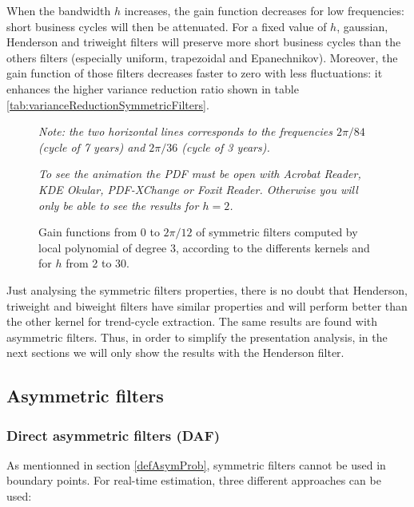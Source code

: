 \documentclass[
  12pt,
  ,
  a4paper]{article}
\newcommand\1{\mathds{1}}
\begin{document}
When the bandwidth \(h\) increases, the gain function decreases for low frequencies: short business cycles will then be attenuated.
For a fixed value of \(h\), gaussian, Henderson and triweight filters will preserve more short business cycles than the others filters (especially uniform, trapezoidal and Epanechnikov).
Moreover, the gain function of those filters decreases faster to zero with less fluctuations: it enhances the higher variance reduction ratio shown in table \ref{tab:varianceReductionSymmetricFilters}.

\begin{figure}[!ht]
\caption{Gain functions from 0 to $2\pi/12$ of symmetric filters computed by local polynomial of degree $3$, according to the differents kernels and for $h$ from 2 to 30.}\label{fig:filtersSymgains}\footnotesize
\emph{Note: the two horizontal lines corresponds to the frequencies $2\pi/84$ (cycle of 7 years) and $2\pi/36$ (cycle of 3 years).}

\emph{To see the animation the PDF must be open with Acrobat Reader, KDE Okular, PDF-XChange or Foxit Reader.
Otherwise you will only be able to see the results for $h=2$.}
\end{figure}

Just analysing the symmetric filters properties, there is no doubt that Henderson, triweight and biweight filters have similar properties and will perform better than the other kernel for trend-cycle extraction.
The same results are found with asymmetric filters.
Thus, in order to simplify the presentation analysis, in the next sections we will only show the results with the Henderson filter.

\hypertarget{asymmetric-filters}{%
\subsection{Asymmetric filters}\label{asymmetric-filters}}

\hypertarget{direct-asymmetric-filters-daf}{%
\subsubsection{Direct asymmetric filters (DAF)}\label{direct-asymmetric-filters-daf}}

As mentionned in section \ref{defAsymProb}, symmetric filters cannot be used in boundary points. For real-time estimation, three different approaches can be used:
\end{document}

